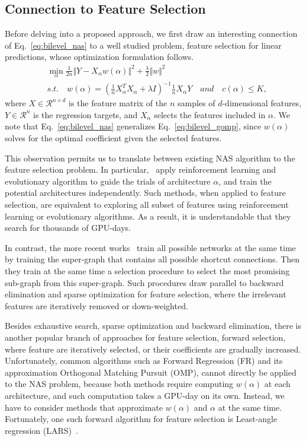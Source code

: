 \subsection{Connection to Feature Selection}

Before delving into a proposed approach, we first draw an interesting connection of Eq.~\ref{eq:bilevel_nas}
to a well studied problem, feature selection for linear predictions, whose optimization formulation follows.
\begin{align}
&\min _{\alpha} \frac{1}{2n} \Vert Y - X_{\alpha} w(\alpha) \Vert ^2 + \frac{\lambda}{2} \Vert w \Vert ^2 \\
&s.t. \quad w(\alpha) = (\frac{1}{n}X_{\alpha}^TX_{\alpha} + \lambda I)^{-1} \frac{1}{n} X_{\alpha}Y 
\quad and \quad c(\alpha) \leq K,
\label{eq:bilevel_gomp}
\end{align}
where $X \in \mathcal{R}^{n \times d}$ is the feature matrix of the $n$ samples of $d$-dimensional features,
$Y \in \mathcal{R}^n$ is the regression targets, and $X_{\alpha}$ selects the features included in $\alpha$.
We note that Eq.~\ref{eq:bilevel_nas} generalizes Eq.~\ref{eq:bilevel_gomp}, since $w(\alpha)$ solves for the 
optimal coefficient given the selected features.

This observation permits us to translate between existing NAS algorithm to the feature selection problem. 
In particular,~\citep{nas,Real2017EvoNet} apply reinforcement learning and evolutionary algorithm to 
guide the trials of architecture $\alpha$, and train the potential architectures independently. 
Such methods, when applied to feature selection, are equivalent to exploring all subset of features 
using reinforcement learning or evolutionary algorithms. As a result, it is understandable that
they search for thousands of GPU-days. 

In contrast, the more recent works~\citep{Pham2018EfficientNA,Liu2018DARTSDA} train all possible
networks at the same time by training the super-graph that contains all possible shortcut connections.
Then they train at the same time a selection procedure to select the most promising 
sub-graph from this super-graph. Such procedures draw parallel to backward elimination 
and sparse optimization for feature selection, 
where the irrelevant features are iteratively removed or down-weighted. 

Besides exhaustive search, sparse optimization and backward elimination, there is another popular branch of approaches 
for feature selection, forward selection, where feature are iteratively selected, or their coefficients are gradually increased. 
Unfortunately, common algorithms such as 
Forward Regression (FR) and its approximation Orthogonal Matching Pursuit (OMP),
cannot 
directly be applied to the NAS problem, because both methods require computing 
$w(\alpha)$ at each architecture, and such computation takes a GPU-day on its own. Instead, we have
to consider methods that approximate $w(\alpha)$ and $\alpha$ at the same time. Fortunately,
one such forward algorithm for feature selection is Least-angle regression (LARS)~\citep{lars}. 

